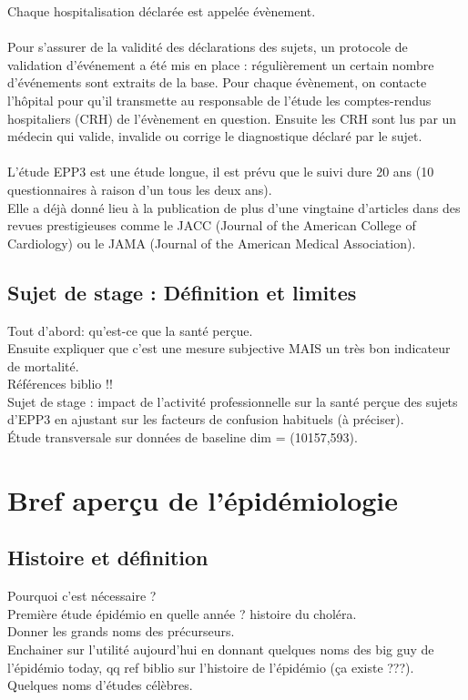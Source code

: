 \documentclass{book}
\begin{document}
Chaque hospitalisation déclarée est appelée évènement.\\
\\
Pour s'assurer de la validité des déclarations des sujets, un protocole de validation d'événement a été mis en place : régulièrement un certain nombre d'événements sont extraits de la base. Pour chaque évènement, on contacte l'hôpital pour qu'il transmette au responsable de l'étude les comptes-rendus hospitaliers (CRH) de l'évènement en question. Ensuite les CRH sont lus par un médecin qui valide, invalide ou corrige le diagnostique déclaré par le sujet.\\
\\
L'étude EPP3 est une étude longue, il est prévu que le suivi dure 20 ans (10 questionnaires à raison d'un tous les deux ans).\\
Elle a déjà donné lieu à la publication de plus d'une vingtaine d'articles dans des revues prestigieuses comme le JACC (Journal of the American College of Cardiology) ou le JAMA (Journal of the American Medical Association).\\
\subsection{Sujet de stage : Définition et limites}
\noindent
Tout d'abord: qu'est-ce que la santé perçue.\\
Ensuite expliquer que c'est une mesure subjective MAIS un très bon indicateur de mortalité.\\
Références biblio !! \\%
Sujet de stage : impact de l'activité professionnelle sur la santé perçue des sujets d'EPP3 en ajustant sur les facteurs de confusion habituels (à préciser).\\
Étude transversale sur données de baseline dim = (10157,593).\\

\newpage
\section{Bref aperçu de l'épidémiologie}

\subsection{Histoire et définition}
\noindent
Pourquoi c'est nécessaire ?\\
Première étude épidémio en quelle année ? histoire du choléra.\\
Donner les grands noms des précurseurs.\\
Enchainer sur l'utilité aujourd'hui en donnant quelques noms des big guy de l'épidémio today, qq ref biblio sur l'histoire de l'épidémio (ça existe ???).\\
Quelques noms d'études célèbres.\\
\end{document}
